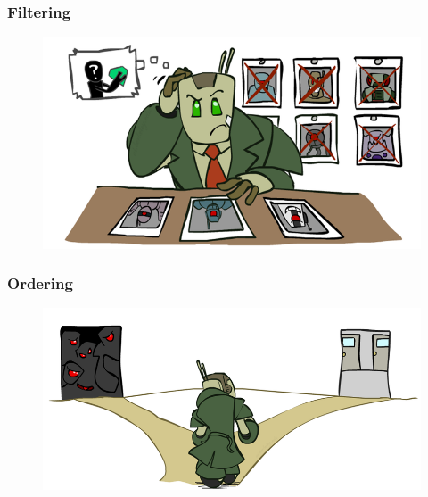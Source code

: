 \documentclass[
	11pt,
]{beamer}
\begin{document}
\begin{frame} 
    \frametitle{Filtering}
    \begin{figure}[h]
        \centering
        \includegraphics[width=\textwidth]{Figs/filtering.png}
    \end{figure}
\end{frame}
\begin{frame}
    \frametitle{Ordering}
    \begin{figure}[h]
        \centering
        \includegraphics[width=\textwidth]{Figs/ordering.png}
    \end{figure}
\end{frame}
\end{document}
